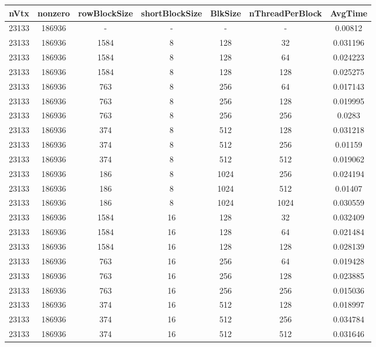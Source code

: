 \documentclass[9pt]{article}
\begin{document}
\SetBgPosition{0.25cm,-5.0cm}
\begin{tabular}{|c|c|c|c|c|c|c| }  
\hline
nVtx  & nonzero  & rowBlockSize  & shortBlockSize  & BlkSize  & nThreadPerBlock  & AvgTime \\
\hline
23133  & 186936  &  -  & -  & -  & -  &0.00812 \\
\hline
23133  & 186936  & 1584  & 8  & 128  & 32  & 0.031196 \\
\hline
23133  & 186936  & 1584  & 8  & 128  & 64  & 0.024223 \\
\hline
23133  & 186936  & 1584  & 8  & 128  & 128  & 0.025275 \\
\hline
23133  & 186936  & 763  & 8  & 256  & 64  & 0.017143 \\
\hline
23133  & 186936  & 763  & 8  & 256  & 128  & 0.019995 \\
\hline
23133  & 186936  & 763  & 8  & 256  & 256  & 0.0283 \\
\hline
23133  & 186936  & 374  & 8  & 512  & 128  & 0.031218 \\
\hline
23133  & 186936  & 374  & 8  & 512  & 256  & 0.01159 \\
\hline
23133  & 186936  & 374  & 8  & 512  & 512  & 0.019062 \\
\hline
23133  & 186936  & 186  & 8  & 1024  & 256  & 0.024194 \\
\hline
23133  & 186936  & 186  & 8  & 1024  & 512  & 0.01407 \\
\hline
23133  & 186936  & 186  & 8  & 1024  & 1024  & 0.030559 \\
\hline
23133  & 186936  & 1584  & 16  & 128  & 32  & 0.032409 \\
\hline
23133  & 186936  & 1584  & 16  & 128  & 64  & 0.021484 \\
\hline
23133  & 186936  & 1584  & 16  & 128  & 128  & 0.028139 \\
\hline
23133  & 186936  & 763  & 16  & 256  & 64  & 0.019428 \\
\hline
23133  & 186936  & 763  & 16  & 256  & 128  & 0.023885 \\
\hline
23133  & 186936  & 763  & 16  & 256  & 256  & 0.015036 \\
\hline
23133  & 186936  & 374  & 16  & 512  & 128  & 0.018997 \\
\hline
23133  & 186936  & 374  & 16  & 512  & 256  & 0.034784 \\
\hline
23133  & 186936  & 374  & 16  & 512  & 512  & 0.031646 \\

\end{tabular}
\end{document}
